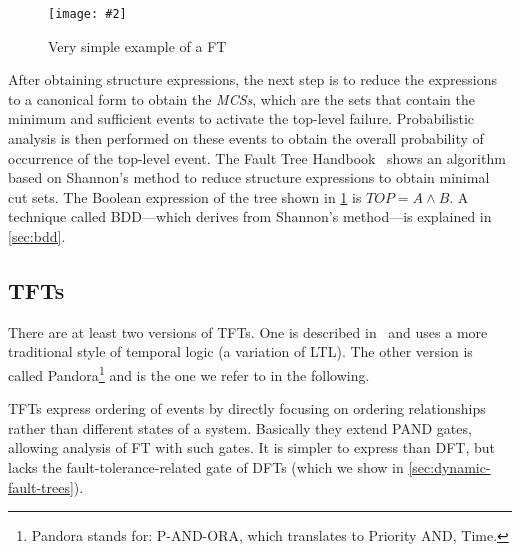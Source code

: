 \documentclass[12pt,openright,twoside,a4paper,oldfontcommands,english,brazil,final]{abntex2}
\theoremstyle{theo}
\newcommand{\includegraphicsaspectratio}[2][1]{%
  \texttt{[image: \#2]}%
}
\def\FThandbook{Fault Tree Handbook~\cite{VGR+1981}\index{Fault Tree!Handbook}%
  \gdef\FThandbook{Fault Tree Handbook\index{Fault Tree!Handbook}\xspace}%
  \xspace}
\def\pandora{Pandora\footnote{Pandora stands for: P-AND-ORA, which translates to Priority AND, Time.}%
  \gdef\pandora{Pandora\xspace}%
  \xspace}
\begin{document}
\begin{figure}[htb]
  \centering
  \includegraphicsaspectratio[0.45]{ex-fault-tree1}
  \caption{Very simple example of a \acl{FT}}
  \label{fig:ex-fault-tree1}
\end{figure}

After obtaining structure expressions, the next step is to reduce the expressions to a canonical form to obtain the \emph{\acp{MCS}}, which are the sets that contain the minimum and sufficient events to activate the top-level failure.
Probabilistic analysis is then performed on these events to obtain the overall probability of occurrence of the top-level event.
The \FThandbook shows an algorithm based on Shannon's method to reduce structure expressions to obtain minimal cut sets.
The Boolean expression of the tree shown in \cref{fig:ex-fault-tree1} is $TOP = A \wedge B$.
A technique called \ac{BDD}---which derives from Shannon's method---is explained in \cref{sec:bdd}.

\subsection{\Aclp*{TFT}}
\label{sec:temporal-fault-trees}

There are at least two versions of \acp{TFT}.
One is described in~\cite{Palshikar2002} and uses a more traditional style of temporal logic (a variation of \ac{LTL}).
The other version is called \pandora and is the one we refer to in the following.

\Acp{TFT} express ordering of events by directly focusing on ordering relationships rather than different states of a system. Basically they extend  \ac{PAND} gates, allowing analysis of \ac{FT} with such gates.
It is simpler to express than \ac{DFT}, but lacks the fault-tolerance-related gate of \acp{DFT} (which we show in \cref{sec:dynamic-fault-trees}).
\end{document}
